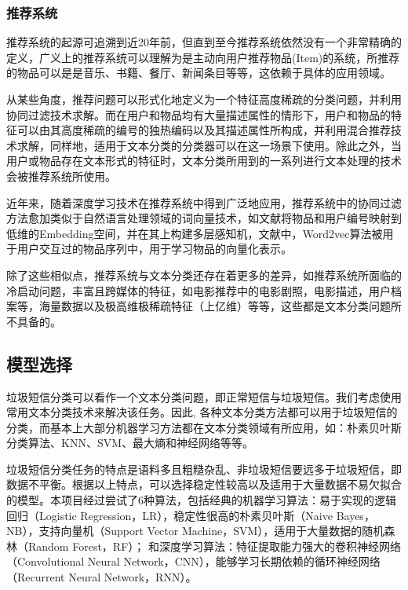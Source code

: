 \documentclass[a4paper]{article}
\begin{document}
\subsubsection{推荐系统}

推荐系统的起源可追溯到近20年前，但直到至今推荐系统依然没有一个非常精确的定义，广义上的推荐系统可以理解为是主动向用户推荐物品(Item)的系统，所推荐的物品可以是是音乐、书籍、餐厅、新闻条目等等，这依赖于具体的应用领域。

从某些角度，推荐问题可以形式化地定义为一个特征高度稀疏的分类问题\cite{herlocker1999algorithmic}，并利用协同过滤技术求解。而在用户和物品均有大量描述属性的情形下，用户和物品的特征可以由其高度稀疏的编号的独热编码以及其描述属性所构成，并利用混合推荐技术求解，同样地，适用于文本分类的分类器可以在这一场景下使用。除此之外，当用户或物品存在文本形式的特征时，文本分类所用到的一系列进行文本处理的技术会被推荐系统所使用。

近年来，随着深度学习技术在推荐系统中得到广泛地应用，推荐系统中的协同过滤方法愈加类似于自然语言处理领域的词向量技术，如文献\cite{he2017neural}将物品和用户编号映射到低维的Embedding空间，并在其上构建多层感知机，文献\cite{barkan2016item2vec}中，Word2vec算法被用于用户交互过的物品序列中，用于学习物品的向量化表示。

除了这些相似点，推荐系统与文本分类还存在着更多的差异，如推荐系统所面临的冷启动问题，丰富且跨媒体的特征，如电影推荐中的电影剧照，电影描述，用户档案等，海量数据以及极高维极稀疏特征（上亿维）等等，这些都是文本分类问题所不具备的。




\subsection{模型选择}
垃圾短信分类可以看作一个文本分类问题，即正常短信与垃圾短信。我们考虑使用常用文本分类技术来解决该任务。因此, 各种文本分类方法都可以用于垃圾短信的分类，而基本上大部分机器学习方法都在文本分类领域有所应用，如：朴素贝叶斯分类算法、KNN、SVM、最大熵和神经网络等等。

垃圾短信分类任务的特点是语料多且粗糙杂乱、非垃圾短信要远多于垃圾短信，即数据不平衡。根据以上特点，可以选择稳定性较高以及适用于大量数据不易欠拟合的模型。本项目经过尝试了6种算法，包括经典的机器学习算法：易于实现的逻辑回归（Logistic Regression，LR），稳定性很高的朴素贝叶斯\cite{sahami1998bayesian}（Naive Bayes，NB），支持向量机\cite{tong2001support}（Support Vector Machine，SVM），适用于大量数据的随机森林\cite{breiman2001random}（Random Forest，RF）； 和深度学习算法：特征提取能力强大的卷积神经网络\cite{kim2014convolutional}（Convolutional Neural Network，CNN），能够学习长期依赖的循环神经网络\cite{sundermeyer2012lstm}（Recurrent Neural Network，RNN）。
\end{document}
